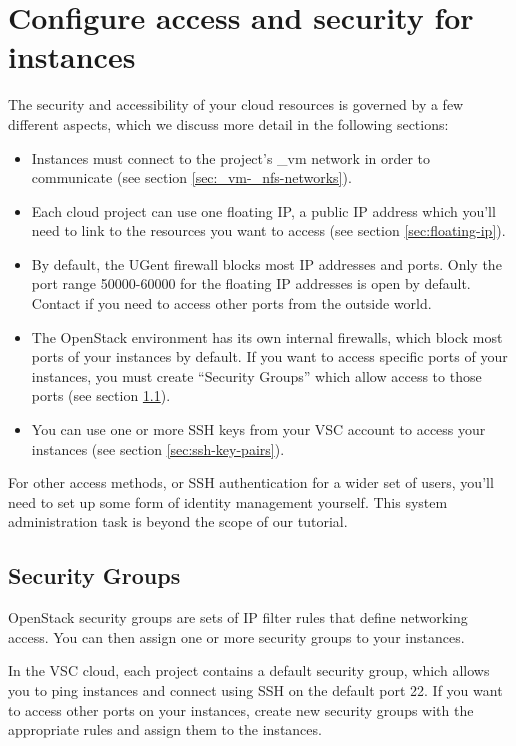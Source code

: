 \chapter{Configure access and security for instances}\label{cha:conf-access-secur}
The security and accessibility of your cloud resources is governed by
a few different aspects, which we discuss more detail in the following
sections:
\begin{itemize}
\item Instances must connect to the project's \_vm network in order to
  communicate (see section \ref{sec:_vm-_nfs-networks}).
\item Each cloud project can use one floating IP, a public IP address
  which you'll need to link to the resources you want to access
  (see section \ref{sec:floating-ip}).
\item By default, the UGent firewall blocks most IP addresses and
  ports.  Only the port range 50000-60000 for the floating IP
  addresses is open by default.  Contact \cloudinfo if you need to
  access other ports from the outside world.
\item The OpenStack environment has its own internal firewalls, which
  block most ports of your instances by default.  If you want to
  access specific ports of your instances, you must create ``Security
  Groups'' which allow access to those ports (see section
  \ref{sec:security-groups}).
\item You can use one or more SSH keys from your VSC account to access
  your instances (see section \ref{sec:ssh-key-pairs}).
\end{itemize}
For other access methods, or SSH authentication for a wider set of
users, you'll need to set up some form of identity management
yourself.  This system administration task is beyond the scope of our
tutorial.

\section{Security Groups}\label{sec:security-groups}
OpenStack security groups are sets of IP filter rules that define
networking access.  You can then assign one or more security groups to
your instances.

In the VSC cloud, each project contains a default security group,
which allows you to ping instances and connect using SSH on the
default port 22.  If you want to access other ports on your instances,
create new security groups with the appropriate rules and assign them
to the instances.

